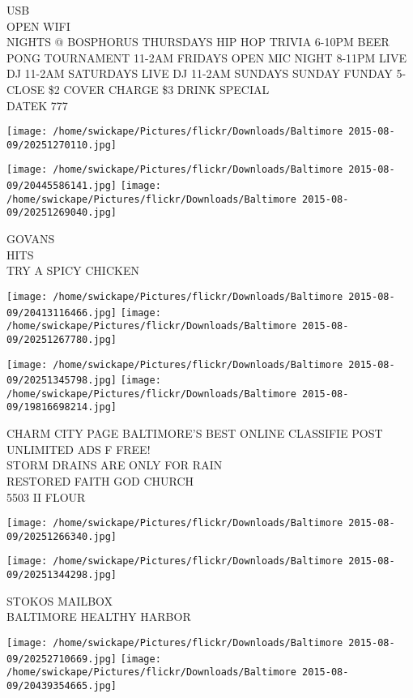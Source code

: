 \documentclass[10pt,letterpaper]{article}
\begin{document}
USB\\
OPEN WIFI\\
NIGHTS @ BOSPHORUS THURSDAYS HIP HOP TRIVIA 6{-}10PM BEER PONG TOURNAMENT 11{-}2AM FRIDAYS OPEN MIC NIGHT 8{-}11PM LIVE DJ 11{-}2AM SATURDAYS LIVE DJ 11{-}2AM SUNDAYS SUNDAY FUNDAY 5{-}CLOSE \$2 COVER CHARGE \$3 DRINK SPECIAL\\
DATEK 777\\
\pagebreak

\texttt{[image: /home/swickape/Pictures/flickr/Downloads/Baltimore 2015-08-09/20251270110.jpg]}

\vspace{0.25in}
\texttt{[image: /home/swickape/Pictures/flickr/Downloads/Baltimore 2015-08-09/20445586141.jpg]}
\texttt{[image: /home/swickape/Pictures/flickr/Downloads/Baltimore 2015-08-09/20251269040.jpg]}

GOVANS\\
HITS\\
TRY A SPICY CHICKEN\\
\pagebreak

\texttt{[image: /home/swickape/Pictures/flickr/Downloads/Baltimore 2015-08-09/20413116466.jpg]}
\texttt{[image: /home/swickape/Pictures/flickr/Downloads/Baltimore 2015-08-09/20251267780.jpg]}

\texttt{[image: /home/swickape/Pictures/flickr/Downloads/Baltimore 2015-08-09/20251345798.jpg]}
\texttt{[image: /home/swickape/Pictures/flickr/Downloads/Baltimore 2015-08-09/19816698214.jpg]}

CHARM CITY PAGE BALTIMORE'S BEST ONLINE CLASSIFIE POST UNLIMITED ADS F FREE!\\
STORM DRAINS ARE ONLY FOR RAIN\\
RESTORED FAITH GOD CHURCH\\
5503 II FLOUR\\
\pagebreak

\texttt{[image: /home/swickape/Pictures/flickr/Downloads/Baltimore 2015-08-09/20251266340.jpg]}

\vspace{0.25in}
\texttt{[image: /home/swickape/Pictures/flickr/Downloads/Baltimore 2015-08-09/20251344298.jpg]}

STOKOS MAILBOX\\
BALTIMORE HEALTHY HARBOR\\
\pagebreak

\texttt{[image: /home/swickape/Pictures/flickr/Downloads/Baltimore 2015-08-09/20252710669.jpg]}
\texttt{[image: /home/swickape/Pictures/flickr/Downloads/Baltimore 2015-08-09/20439354665.jpg]}
\end{document}
